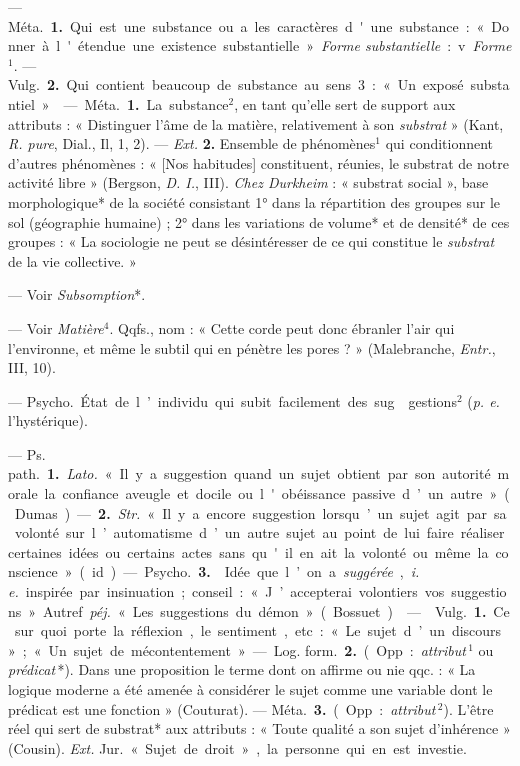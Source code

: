 \begin{itemize}[leftmargin=1cm, label=, itemsep=1pt]
 — \si{Méta.} {\bf 1.} Qui est une substance ou a les
caractères d'une substance : « Donner à l'étendue une existence
substantielle ». {\it Forme substantielle} : v. {\it Forme}$^1$. —
\si{Vulg.}  {\bf 2.} Qui contient beaucoup de substance au sens 3 : « Un
exposé substantiel. »

 — \si{Méta.} {\bf 1.} La
substance$^2$, en tant qu’elle sert de
support aux attributs : « Distinguer l'âme de la matière, relativement à son
{\it substrat} » (Kant, {\it R. pure}, Dial., Il, 1, 2). — {\it Ext.}
{\bf 2.} Ensemble de phénomènes$^1$ qui conditionnent d’autres phénomènes :
« [Nos habitudes] constituent, réunies, le substrat de notre activité libre
» (Bergson, {\it D. I.}, III). {\it Chez Durkheim} : « substrat social »,
base morphologique* de la société consistant 1° dans la répartition des
groupes sur le sol (géographie humaine) ; 2° dans les variations de volume*
et de densité* de ces groupes : « La sociologie ne peut se désintéresser de
ce qui constitue le {\it substrat} de la vie collective. »

 — Voir {\it Subsomption}*.

 — Voir {\it Matière}$^4$. Qqfs., nom : « Cette corde peut donc
ébranler l’air qui l’environne, et même le subtil qui en pénètre les pores ?
» (Malebranche, {\it Entr.}, III, 10).

 — \si{Psycho.} État de l’individu qui subit facilement
des sug\-gestions$^2$ ({\it p. e.} l’hystérique).

 — \si{Ps. path.} {\bf 1.} {\it Lato.} « Il y a suggestion
quand un sujet obtient par son autorité morale la confiance aveugle et
docile ou l'obéissance passive d’un autre » (Dumas). — {\bf 2.} {\it Str.} «
Il y a encore suggestion lorsqu’un sujet agit par sa volonté sur
l’automatisme d’un autre sujet au point de lui faire réaliser certaines
idées ou certains actes sans qu'il en ait la volonté ou même la conscience
» (id.).

— \si{Psycho.} {\bf 3.}  Idée que l’on a {\it suggérée},
{\it i. e.} inspirée par insinuation ; conseil : « J’accepterai volontiers
vos suggestions ». Autref. {\it péj.} « Les suggestions du démon » (Bossuet).

 —  \si{Vulg.} {\bf 1.} Ce sur quoi porte la
réflexion, le sentiment, etc. : « Le sujet d’un discours »; « Un sujet de
mécontentement ». — \si{Log. form.}  {\bf 2.} (Opp. : {\it attribut}$\,^1$ ou
{\it prédicat}\,*). Dans une proposition le terme dont on affirme ou nie
qqc. : « La logique moderne a été amenée à considérer le sujet comme une
variable dont le prédicat est une fonction » (Couturat). — \si{Méta.}
{\bf 3.} (Opp. : {\it attribut}$\,^2$). L'être réel qui sert de substrat* aux
attributs : « Toute qualité a son sujet d’inhérence » (Cousin). {\it Ext.}
\si{Jur.} « Sujet de droit », la personne qui en est investie.


\end{itemize}
